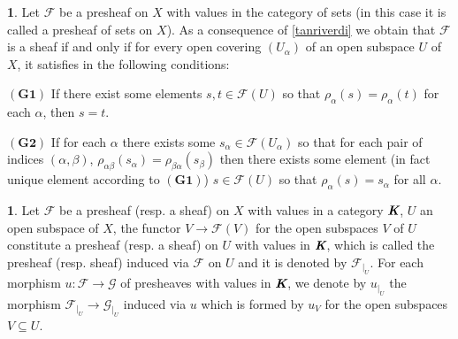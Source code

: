 \documentclass[12pt]{amsart}
\theoremstyle{definition}
\newtheorem{bk}[proposition]{}
\begin{document}
\begin{bk}\label{1.2} Let $\mathscr{F}$ be a presheaf on $X$ with values in the category of sets (in this case it is called a presheaf of sets on $X$). As a consequence of \ref{tanriverdi} we obtain that $\mathscr{F}$ is a sheaf if and only if for every open covering $(U_{\alpha})$ of an open subspace $U$ of $X$, it satisfies in the following conditions:

$(\mathbf{G1})$ If there exist some elements $s, t\in\mathscr{F}(U)$ so that $\rho_{\alpha}(s)=\rho_{\alpha}(t)$ for each $\alpha$, then $s=t$.

$(\mathbf{G2})$ If for each $\alpha$ there exists some $s_{\alpha}\in\mathscr{F}(U_{\alpha})$ so that for each pair of indices $(\alpha, \beta)$, $\rho_{\alpha\beta}(s_{\alpha})=\rho_{\beta\alpha}(s_{\beta})$ then there exists some element (in fact unique element according to $(\mathbf{G1})$) $s\in\mathscr{F}(U)$ so that $\rho_{\alpha}(s)=s_{\alpha}$ for all $\alpha$.

\end{bk}


\begin{bk}\label{I: 3.1.5} Let $\mathscr{F}$ be a presheaf (resp. a sheaf) on $X$ with values in a category $\emph{\textbf{K}}$, $U$ an open subspace of $X$, the functor
$V\rightarrow\mathscr{F}(V)$ for the open subspaces $V$ of $U$ constitute a presheaf (resp. a sheaf) on $U$ with values in $\emph{\textbf{K}}$, which is called the presheaf (resp. sheaf) induced via $\mathscr{F}$ on $U$ and it is denoted by $\mathscr{F}_{|_{U}}$.
For each morphism $u:\mathscr{F}\rightarrow\mathscr{G}$ of presheaves with values in $\emph{\textbf{K}}$, we denote by $u_{|_{U}}$ the morphism $\mathscr{F}_{|_{U}}\rightarrow\mathscr{G}_{|_{U}}$ induced via $u$ which is formed by $u_{V}$ for the open subspaces $V\subseteq U$.

\end{bk}
\end{document}
